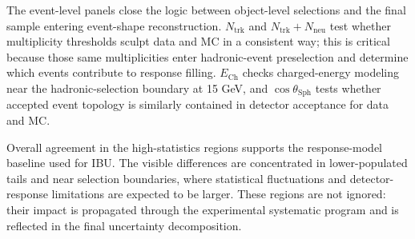 The event-level panels close the logic between object-level selections and the final sample
entering event-shape reconstruction. $N_{\mathrm{trk}}$ and
$N_{\mathrm{trk}}+N_{\mathrm{neu}}$ test whether multiplicity thresholds sculpt data and MC in a
consistent way; this is critical because those same multiplicities enter hadronic-event
preselection and determine which events contribute to response filling. $E_{\mathrm{Ch}}$ checks
charged-energy modeling near the hadronic-selection boundary at 15 GeV, and
$\cos\theta_{\mathrm{Sph}}$ tests whether accepted event topology is similarly contained in
detector acceptance for data and MC.

Overall agreement in the high-statistics regions supports the response-model baseline used for IBU.
The visible differences are concentrated in lower-populated tails and near selection boundaries,
where statistical fluctuations and detector-response limitations are expected to be larger. These
regions are not ignored: their impact is propagated through the experimental systematic program and
is reflected in the final uncertainty decomposition.

\FloatBarrier
\clearpage

